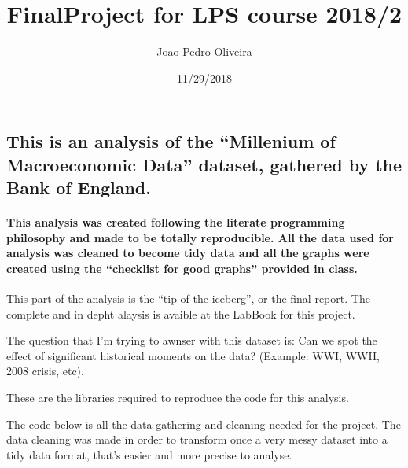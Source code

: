 \documentclass[]{article}
\title{FinalProject for LPS course 2018/2}
\author{Joao Pedro Oliveira}
\date{11/29/2018}
\let\oldparagraph\paragraph
\renewcommand{\paragraph}[1]{\oldparagraph{#1}\mbox{}}
\begin{document}
\maketitle

\subsection{\texorpdfstring{This is an analysis of the ``Millenium of
Macroeconomic Data'' dataset, gathered by the Bank of
England.}{This is an analysis of the Millenium of Macroeconomic Data dataset, gathered by the Bank of England.}}\label{this-is-an-analysis-of-the-millenium-of-macroeconomic-data-dataset-gathered-by-the-bank-of-england.}

\paragraph{\texorpdfstring{This analysis was created following the
literate programming philosophy and made to be totally reproducible. All
the data used for analysis was cleaned to become tidy data and all the
graphs were created using the ``checklist for good graphs'' provided in
class.}{This analysis was created following the literate programming philosophy and made to be totally reproducible. All the data used for analysis was cleaned to become tidy data and all the graphs were created using the checklist for good graphs provided in class.}}\label{this-analysis-was-created-following-the-literate-programming-philosophy-and-made-to-be-totally-reproducible.-all-the-data-used-for-analysis-was-cleaned-to-become-tidy-data-and-all-the-graphs-were-created-using-the-checklist-for-good-graphs-provided-in-class.}

This part of the analysis is the ``tip of the iceberg'', or the final
report. The complete and in depht alaysis is avaible at the LabBook for
this project.

The question that I'm trying to awnser with this dataset is: Can we spot
the effect of significant historical moments on the data? (Example: WWI,
WWII, 2008 crisis, etc).

These are the libraries required to reproduce the code for this
analysis.

The code below is all the data gathering and cleaning needed for the
project. The data cleaning was made in order to transform once a very
messy dataset into a tidy data format, that's easier and more precise to
analyse.
\end{document}
